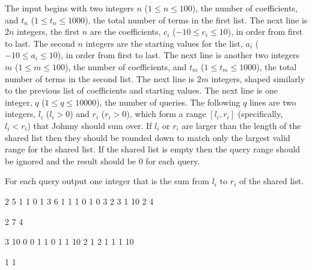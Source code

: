 \newpage
\begin{formalin}
The input begins with two integers $n$ ($1 \leq n \leq 100$), the number of coefficients, and $t_n$ ($1 \leq t_n \leq 1000$), the total number of terms in the first list.
The next line is $2n$ integers, the first $n$ are the coefficients, $c_i$ ($-10 \leq c_i \leq 10$), in order from first to last.
The second $n$ integers are the starting values for the list, $a_i$ ($-10 \leq a_i \leq 10$), in order from first to last.
The next line is another two integers $m$ ($1 \leq m \leq 100$), the number of coefficients, and $t_m$ ($1 \leq t_m \leq 1000$), the total number of terms in the second list.
The next line is $2m$ integers, shaped similarly to the previous list of coefficients and starting values.
The next line is one integer, $q$ ($1 \leq q \leq 10000$), the number of queries.
The following $q$ lines are two integers, $l_i$ ($l_i > 0$) and $r_i$ ($r_i > 0$), which form a range $[l_i, r_i]$ (specifically, $l_i < r_i$) that Johnny should sum over.
If $l_i$ or $r_i$ are larger than the length of the shared list then they should be rounded down to match only the largest valid range for the shared list.
If the shared list is empty then the query range should be ignored and the result should be $0$ for each query.
\end{formalin}

\begin{formalout}
For each query output one integer that is the sum from $l_i$ to $r_i$ of the shared list.
\end{formalout}

\begin{datain}
2 5
1 1 0 1
3 6
1 1 1 0 1 0
3
2 3
1 10
2 4
\end{datain}
\begin{dataout}
2
7
4
\end{dataout}

\begin{datain}
3 10
0 0 1 1 0 1
1 10
2 1
2
1 1
1 10
\end{datain}
\begin{dataout}
1
1
\end{dataout}
